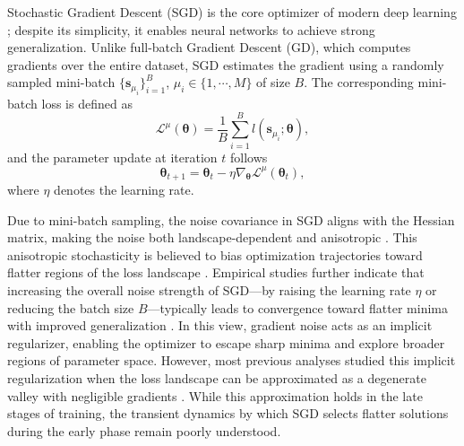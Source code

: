 \documentclass[aps,prx,reprint,superscriptaddress,longbibliography,nofootinbib,floatfix]{revtex4-2}
\begin{document}
Stochastic Gradient Descent (SGD) is the core optimizer of modern deep learning \cite{robbinsStochasticApproximationMethod1951,bottouLargeScaleMachineLearning2010}; despite its simplicity, it enables neural networks to achieve strong generalization. Unlike full-batch Gradient Descent (GD), which computes gradients over the entire dataset, SGD estimates the gradient using a randomly sampled mini-batch $\{\bm{s}_{\mu_i}\}_{i=1}^{B}$, ${\mu_i\in\{1,\cdots,M\}}$ of size $B$. The corresponding mini-batch loss is defined as
\begin{equation}
    \mathcal{L}^{\mu}(\bm{\theta})=\frac{1}{B}\sum_{i=1}^B l(\bm{s}_{\mu_i};\bm{\theta}),
\end{equation}
and the parameter update at iteration $t$ follows
\begin{equation} \label{eq:updating_rule_SGD}
    \bm{\theta}_{t+1}=\bm{\theta}_{t}-\eta \nabla_{\bm{\theta}} \mathcal{L}^{\mu}\left(\bm{\theta}_{t}\right), 
\end{equation}
where $\eta$ denotes the learning rate.

Due to mini-batch sampling, the noise covariance in SGD aligns with the Hessian matrix, making the noise both landscape-dependent and anisotropic \cite{xieOverlookedStructureStochastic2023,haochenShapeMattersUnderstanding2021}. 
This anisotropic stochasticity is believed to bias optimization trajectories toward flatter regions of the loss landscape \cite{fengInverseVarianceFlatness2021,zhuAnisotropicNoiseStochastic2019,xieDiffusionTheoryDeep2021,liHessianBasedAnalysis2020,yangStochasticGradientDescent2023}. 
Empirical studies further indicate that increasing the overall noise strength of SGD—by raising the learning rate $\eta$ or reducing the batch size $B$—typically leads to convergence toward flatter minima with improved generalization \cite{keskarLargeBatchTrainingDeep2017,chaudhariEntropySGDBiasingGradient2019,jastrzebskiThreeFactorsInfluencing2018}. In this view, gradient noise acts as an implicit regularizer, enabling the optimizer to escape sharp minima and explore broader regions of parameter space. However, most previous analyses studied this implicit regularization when the loss landscape can be approximated as a degenerate valley with negligible gradients \cite{zhuAnisotropicNoiseStochastic2019,xieDiffusionTheoryDeep2021,weiHowNoiseAffects2019,yangStochasticGradientDescent2023}. While this approximation holds in the late stages of training, the transient dynamics by which SGD selects flatter solutions during the early phase remain poorly understood.
\end{document}
